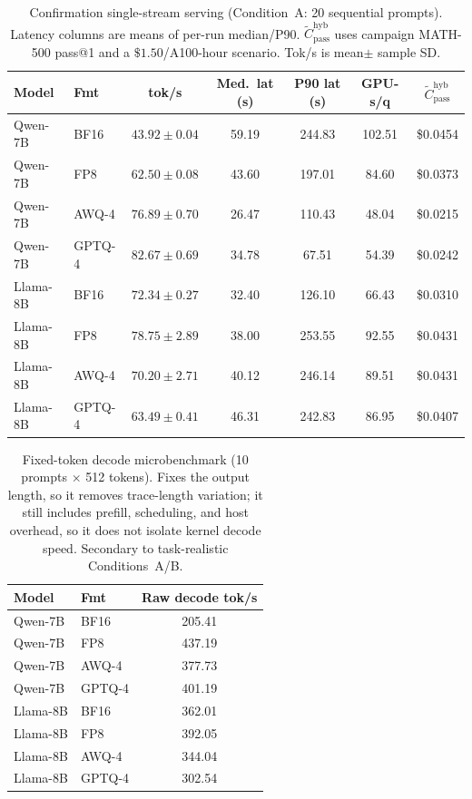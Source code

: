 \documentclass[11pt,a4paper]{article}
\begin{document}
\begin{table}[!htbp]
\centering
\caption{Confirmation single-stream serving (Condition~A: 20 sequential prompts). Latency columns are means of per-run median/P90. $\widetilde{C}_{\mathrm{pass}}^{\mathrm{hyb}}$ uses campaign MATH-500 pass@1 and a $\$1.50$/A100-hour scenario. Tok/s is mean$\pm$ sample SD.}
\label{tab:serving-single}
\small
\begin{tabular}{llccccc}
\toprule
\textbf{Model} & \textbf{Fmt} & \textbf{tok/s} & \textbf{Med.\ lat (s)} & \textbf{P90 lat (s)} & \textbf{GPU-s/q} & \textbf{$\widetilde{C}_{\mathrm{pass}}^{\mathrm{hyb}}$} \\
\midrule
Qwen-7B & BF16   & $43.92\pm 0.04$ & 59.19 & 244.83 & 102.51 & \$0.0454 \\
Qwen-7B & FP8    & $62.50\pm 0.08$ & 43.60 & 197.01 & 84.60 & \$0.0373 \\
Qwen-7B & AWQ-4  & $76.89\pm 0.70$ & 26.47 & 110.43 & 48.04 & \$0.0215 \\
Qwen-7B & GPTQ-4 & $82.67\pm 0.69$ & 34.78 & 67.51 & 54.39 & \$0.0242 \\
\midrule
Llama-8B & BF16   & $72.34\pm 0.27$ & 32.40 & 126.10 & 66.43 & \$0.0310 \\
Llama-8B & FP8    & $78.75\pm 2.89$ & 38.00 & 253.55 & 92.55 & \$0.0431 \\
Llama-8B & AWQ-4  & $70.20\pm 2.71$ & 40.12 & 246.14 & 89.51 & \$0.0431 \\
Llama-8B & GPTQ-4 & $63.49\pm 0.41$ & 46.31 & 242.83 & 86.95 & \$0.0407 \\
\bottomrule
\end{tabular}
\end{table}

\begin{table}[!htbp]
\centering
\caption{Fixed-token decode microbenchmark (10 prompts $\times$ 512 tokens). Fixes the output length, so it removes trace-length variation; it still includes prefill, scheduling, and host overhead, so it does not isolate kernel decode speed. Secondary to task-realistic Conditions~A/B.}
\label{tab:serving-micro}
\small
\begin{tabular}{llc}
\toprule
\textbf{Model} & \textbf{Fmt} & \textbf{Raw decode tok/s} \\
\midrule
Qwen-7B & BF16   & 205.41 \\
Qwen-7B & FP8    & 437.19 \\
Qwen-7B & AWQ-4  & 377.73 \\
Qwen-7B & GPTQ-4 & 401.19 \\
\midrule
Llama-8B & BF16   & 362.01 \\
Llama-8B & FP8    & 392.05 \\
Llama-8B & AWQ-4  & 344.04 \\
Llama-8B & GPTQ-4 & 302.54 \\
\bottomrule
\end{tabular}
\end{table}
\end{document}
